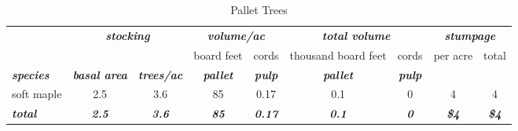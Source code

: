 \documentclass[landscape]{article}
\begin{document}
\begin{table}[H]

\caption{\label{tab:unnamed-chunk-27}Pallet Trees}
\fontsize{10}{12}\selectfont
\begin{tabular}[t]{lcccccccc}
\toprule
\multicolumn{1}{c}{\em{\textbf{ }}} & \multicolumn{2}{c}{\em{\textbf{stocking}}} & \multicolumn{2}{c}{\em{\textbf{volume/ac }}} & \multicolumn{2}{c}{\em{\textbf{total volume}}} & \multicolumn{2}{c}{\em{\textbf{stumpage}}} \\
\cmidrule(l{3pt}r{3pt}){2-3} \cmidrule(l{3pt}r{3pt}){4-5} \cmidrule(l{3pt}r{3pt}){6-7} \cmidrule(l{3pt}r{3pt}){8-9}
\multicolumn{3}{c}{ } & \multicolumn{1}{c}{board feet} & \multicolumn{1}{c}{cords} & \multicolumn{1}{c}{thousand board feet} & \multicolumn{1}{c}{cords} & \multicolumn{1}{c}{per acre} & \multicolumn{1}{c}{total} \\
\cmidrule(l{3pt}r{3pt}){4-4} \cmidrule(l{3pt}r{3pt}){5-5} \cmidrule(l{3pt}r{3pt}){6-6} \cmidrule(l{3pt}r{3pt}){7-7} \cmidrule(l{3pt}r{3pt}){8-8} \cmidrule(l{3pt}r{3pt}){9-9}
\rowcolor[HTML]{DCDCDC}  \em{\textbf{species}} & \em{\textbf{basal area}} & \em{\textbf{trees/ac}} & \em{\textbf{pallet}} & \em{\textbf{pulp}} & \em{\textbf{pallet}} & \em{\textbf{pulp}} & \em{\textbf{ }} & \em{\textbf{ }}\\
\midrule
\rowcolor{gray!6}  soft maple & 2.5 & 3.6 & 85 & 0.17 & 0.1 & 0 & 4 & 4\\
 
\rowcolor[HTML]{DCDCDC}  \em{\textbf{total}} & \em{\textbf{2.5}} & \em{\textbf{3.6}} & \em{\textbf{85}} & \em{\textbf{0.17}} & \em{\textbf{0.1}} & \em{\textbf{0}} & \em{\textbf{\$4}} & \em{\textbf{\$4}}\\
\bottomrule
\end{tabular}
\end{table}
\end{document}

